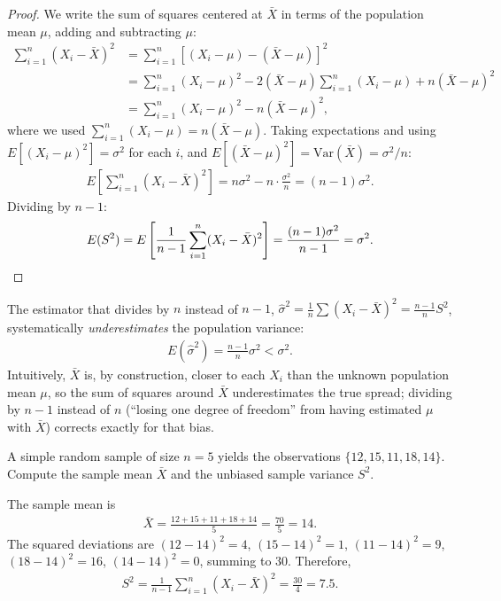 \begin{proof}
We write the sum of squares centered at $\bar{X}$ in terms of the population mean $\mu$, adding and subtracting $\mu$:
\begin{align}
 \sum_{i=1}^n (X_i - \bar{X})^2
 &= \sum_{i=1}^n \left[(X_i - \mu) - (\bar{X} - \mu)\right]^2 \\
 &= \sum_{i=1}^n (X_i - \mu)^2 - 2(\bar{X}-\mu)\sum_{i=1}^n(X_i-\mu) + n(\bar{X}-\mu)^2 \\
 &= \sum_{i=1}^n (X_i - \mu)^2 - n(\bar{X}-\mu)^2,
\end{align}
where we used $\sum_{i=1}^n (X_i - \mu) = n(\bar{X}-\mu)$. Taking expectations and using $E[(X_i-\mu)^2] = \sigma^2$ for each $i$, and $E[(\bar{X}-\mu)^2] = \text{Var}(\bar{X}) = \sigma^2/n$:
\begin{align}
 E\left[\sum_{i=1}^n (X_i - \bar{X})^2\right] = n\sigma^2 - n\cdot\frac{\sigma^2}{n}
 = (n-1)\sigma^2.
\end{align}
Dividing by $n-1$:
\begin{align}
 E(S^2) = E\left[\frac{1}{n-1}\sum_{i=1}^n (X_i - \bar{X})^2\right]
 = \frac{(n-1)\sigma^2}{n-1} = \sigma^2. \qedhere
\end{align}
\end{proof}

\begin{observacion}
The estimator that divides by $n$ instead of $n-1$, $\hat{\sigma}^2 = \frac{1}{n}\sum(X_i-\bar{X})^2 = \frac{n-1}{n}S^2$, systematically \emph{underestimates} the population variance:
\begin{align}
 E(\hat{\sigma}^2) = \frac{n-1}{n}\sigma^2 < \sigma^2.
\end{align}
Intuitively, $\bar{X}$ is, by construction, closer to each $X_i$ than the unknown population mean $\mu$, so the sum of squares around $\bar{X}$ underestimates the true spread; dividing by $n-1$ instead of $n$ (``losing one degree of freedom'' from having estimated $\mu$ with $\bar{X}$) corrects exactly for that bias.
\end{observacion}

\begin{ejemplo}
 \label{exmp:sample-mean-and-unbiased-variance}
A simple random sample of size $n=5$ yields the observations $\{12, 15, 11, 18, 14\}$. Compute the sample mean $\bar{X}$ and the unbiased sample variance $S^2$.
\end{ejemplo}

\begin{solucion}
The sample mean is
\begin{align}
 \bar{X} = \frac{12+15+11+18+14}{5} = \frac{70}{5} = 14.
\end{align}
The squared deviations are $(12-14)^2=4$, $(15-14)^2=1$, $(11-14)^2=9$, $(18-14)^2=16$, $(14-14)^2=0$, summing to $30$. Therefore,
\begin{align}
 S^2 = \frac{1}{n-1}\sum_{i=1}^n (X_i-\bar{X})^2 = \frac{30}{4} = 7.5.
\end{align}
\end{solucion}



